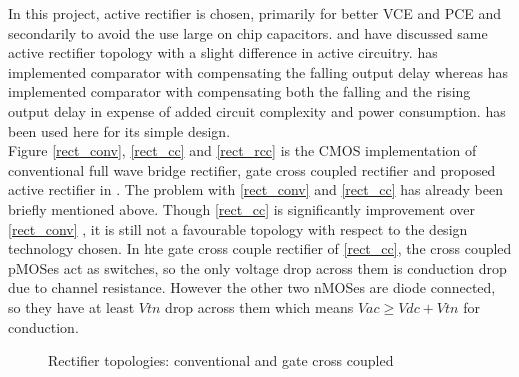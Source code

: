 \documentclass[12pt,a4paper,UKenglish]{article}
\begin{document}
In this project, active rectifier is chosen, primarily for better VCE and PCE and secondarily to avoid the use large on chip capacitors. \cite{rectrcc}  and \cite{rectcomp} have discussed same active rectifier topology with a slight difference in active circuitry. \cite{rectrcc} has implemented comparator with compensating the falling output delay whereas \cite{rectcomp} has implemented comparator with compensating both the falling and the rising output delay in expense of added circuit complexity and power consumption. \cite{rectrcc} has been used here for its simple design. \\

Figure \ref{rect_conv}, \ref{rect_cc} and \ref{rect_rcc} is the CMOS implementation of conventional full wave bridge rectifier, gate cross coupled rectifier and proposed active rectifier in \cite{rectrcc}. The problem with \ref{rect_conv} and \ref{rect_cc} has already been briefly mentioned above. Though  \ref{rect_cc}  is significantly improvement over  \ref{rect_conv} , it is still not a favourable topology with respect to the design technology chosen. In hte gate cross couple rectifier of  \ref{rect_cc}, the cross coupled pMOSes act as switches, so the only voltage drop across them is conduction drop due to channel resistance. However the other two nMOSes are diode connected, so they have at least $Vtn$ drop across them which means $Vac \geq Vdc + Vtn$ for conduction. 

\begin{figure} [htbp]
  \centering 
\hfill
 \caption{Rectifier topologies: conventional and gate cross coupled} 
\label{rect_conv_cc} 
\end{figure}
\end{document}
